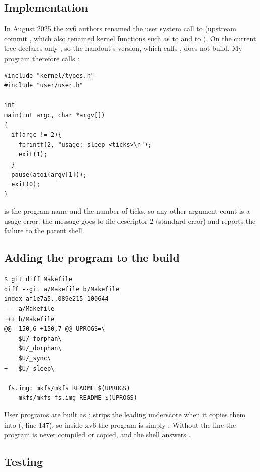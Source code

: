 \documentclass[11pt,a4paper]{article}
\begin{document}
\subsection{Implementation}

In August 2025 the xv6 authors renamed the user system call  to
 (upstream commit , which also renamed kernel functions such as
 to  and  to ). On the current tree
 declares only , so the handout's version, which calls
, does not build. My program therefore calls :

\begin{lstlisting}[style=ccode]
#include "kernel/types.h"
#include "user/user.h"

int
main(int argc, char *argv[])
{
  if(argc != 2){
    fprintf(2, "usage: sleep <ticks>\n");
    exit(1);
  }
  pause(atoi(argv[1]));
  exit(0);
}
\end{lstlisting}

 is the program name and  the number of ticks, so any other
argument count is a usage error: the message goes to file descriptor 2 (standard error) and
 reports the failure to the parent shell.

\subsection{Adding the program to the build}

\begin{lstlisting}
$ git diff Makefile
diff --git a/Makefile b/Makefile
index af1e7a5..089e215 100644
--- a/Makefile
+++ b/Makefile
@@ -150,6 +150,7 @@ UPROGS=\
 	$U/_forphan\
 	$U/_dorphan\
 	$U/_sync\
+	$U/_sleep\

 fs.img: mkfs/mkfs README $(UPROGS)
 	mkfs/mkfs fs.img README $(UPROGS)
\end{lstlisting}

User programs are built as ;  strips the leading underscore when
it copies them into \code{fs.img} (, line 147), so inside xv6 the program is
simply . Without the  line the program is never compiled or copied, and
the shell answers .

\subsection{Testing}
\end{document}
